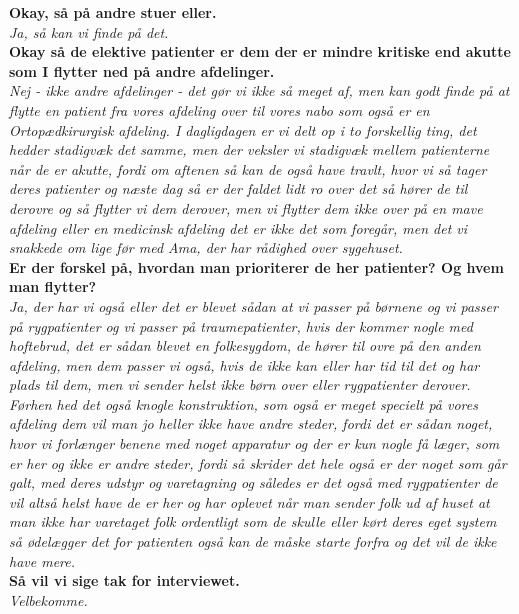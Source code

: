 \noindent
\textbf{Okay, så på andre stuer eller.}\\
\noindent
\textit{Ja, så kan vi finde på det.}\\
\noindent
\textbf{Okay så de elektive patienter er dem der er mindre kritiske end akutte som I flytter ned på andre afdelinger.} \\
\noindent
\textit{Nej - ikke andre afdelinger - det gør vi ikke så meget af, men kan godt finde på at flytte en patient fra vores afdeling over til vores nabo som også er en Ortopædkirurgisk afdeling. I dagligdagen er vi delt op i to forskellig ting, det hedder stadigvæk det samme, men der veksler vi stadigvæk mellem patienterne når de er akutte, fordi om aftenen så kan de også have travlt, hvor vi så tager deres patienter og næste dag så er der faldet lidt ro over det så hører de til derovre og så flytter vi dem derover, men vi flytter dem ikke over på en mave afdeling eller en medicinsk afdeling det er ikke det som foregår, men det vi snakkede om lige før med Ama, der har rådighed over sygehuset.}\\
\noindent
\textbf{Er der forskel på, hvordan man prioriterer de her patienter? Og hvem man flytter?}\\
\noindent
\textit{Ja, der har vi også eller det er blevet sådan at vi passer på børnene og vi passer på rygpatienter og vi passer på traumepatienter, hvis der kommer nogle med hoftebrud, det er sådan blevet en folkesygdom, de hører til ovre på den anden afdeling, men dem passer vi også, hvis de ikke kan eller har tid til det og har plads til dem, men vi sender helst ikke børn over eller rygpatienter derover. Førhen hed det også knogle konstruktion, som også er meget specielt på vores afdeling dem vil man jo heller ikke have andre steder, fordi det er sådan noget, hvor vi forlænger benene med noget apparatur og der er kun nogle få læger, som er her og ikke er andre steder, fordi så skrider det hele også er der noget som går galt, med deres udstyr og varetagning og således er det også med rygpatienter de vil altså helst have de er her og har oplevet når man sender folk ud af huset at man ikke har varetaget folk ordentligt som de skulle eller kørt deres eget system så ødelægger det for patienten også kan de måske starte forfra og det vil de ikke have mere.}   \\
\noindent
\textbf{Så vil vi sige tak for interviewet.}\\
\noindent
\textit{Velbekomme.}\\


